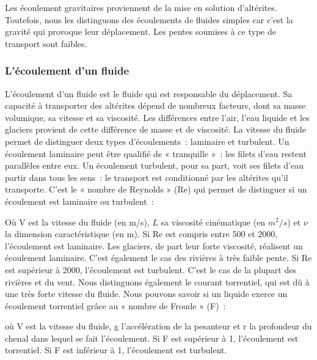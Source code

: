 \documentclass[a4paper,11pt]{article}
\begin{document}
Les écoulement gravitaires proviennent de la mise en solution d'altérites.
Toutefois, nous les distinguons des écoulements de fluides simples car c'est la gravité qui provoque leur déplacement. Les pentes soumises à ce type de transport sont faibles.

\subsubsection{L'écoulement d'un fluide}

L'écoulement d'un fluide est le fluide qui est responsable du déplacement.
Sa capacité à transporter des altérites dépend de nombreux facteurs, dont sa masse volumique, sa vitesse et sa viscosité.
Les différences entre l'air, l'eau liquide et les glaciers provient de cette différence de masse et de viscosité.
La vitesse du fluide permet de distinguer deux types d'écoulements~: laminaire et turbulent.
Un écoulement laminaire peut être qualifié de « tranquille »~: les filets d'eau restent parallèles entre eux.
Un écoulement turbulent, pour sa part, voit ses filets d'eau partir dans tous les sens~: le transport est conditionné par les altérites qu'il transporte.
C'est le « nombre de Reynolds » (Re) qui permet de distinguer si un écoulement est laminaire ou turbulent~:
\begin{center}
\end{center}
Où V est la vitesse du fluide (en m/s), $L$ sa viscosité cinématique (en $m^2/s$) et $\nu$ la dimension caractéristique (en m).
\medbreak
Si Re est compris entre 500 et 2000, l’écoulement est laminaire.
Les glaciers, de part leur forte viscosité, réalisent un écoulement laminaire.
C'est également le cas des rivières à très faible pente.
Si Re est supérieur à 2000, l’écoulement est turbulent.
C’est le cas de la plupart des rivières et du vent.
Nous distinguons également le courant torrentiel, qui est dû à une très forte vitesse du fluide.
Nous pouvons savoir si un liquide exerce un écoulement torrentiel grâce au « nombre de Froude » (F)~:
\begin{center}
\end{center}
où V est la vitesse du fluide, g l'accélération de la pesanteur et r la profondeur du chenal dans lequel se fait l'écoulement.
Si F est supérieur à 1, l’écoulement est torrentiel.
Si F est inférieur à 1, l’écoulement est turbulent. \\
\end{document}
